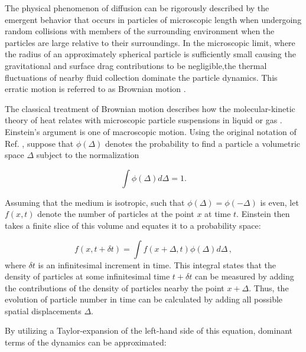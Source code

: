 The physical phenomenon of diffusion can be rigorously described by the emergent behavior that occurs in particles of microscopic length when undergoing random collisions with members of the surrounding environment when the particles are large relative to their surroundings. In the microscopic limit, where the radius of an approximately spherical particle is sufficiently small causing the gravitational and surface drag contributions to be negligible,the thermal fluctuations of nearby fluid collection dominate the particle dynamics. This erratic motion is referred to as Brownian motion \cite{brownXXVIIBriefAccount1828}. 

The classical treatment of Brownian motion describes how the molecular-kinetic theory of heat relates with microscopic particle suspensions in liquid or gas \cite{einstein1956investigations,pathriaStatisticalMechanics2011}. Einstein's argument is one of macroscopic motion.  Using the original notation of Ref. \cite{einstein1956investigations}, suppose that $\phi(\Delta)$ denotes the probability to find a particle a volumetric space $\Delta$ subject to the normalization

\begin{equation}
	\int \phi(\Delta) d\Delta = 1.
\end{equation}

Assuming that the medium is isotropic, such that $\phi(\Delta) = \phi(-\Delta)$ is even, let $f(x,t)$ denote the number of particles at the point $x$ at time $t$. Einstein then takes a finite slice of this volume and equates it to a probability space:

\begin{equation}
	f(x, t + \delta t)  = \int f(x + \Delta, t)\phi(\Delta) d\Delta \,,
\end{equation}
where $\delta t$ is an infinitesimal increment in time. This integral states that the density of particles at some infinitesimal time $t + \delta t$ can be measured by adding the contributions of the density of particles nearby the point $x + \Delta$. Thus, the evolution of particle number in time can be calculated by adding all possible spatial displacements $\Delta$. 

By utilizing a Taylor-expansion of the left-hand side of this equation, dominant terms of the dynamics can be approximated:

